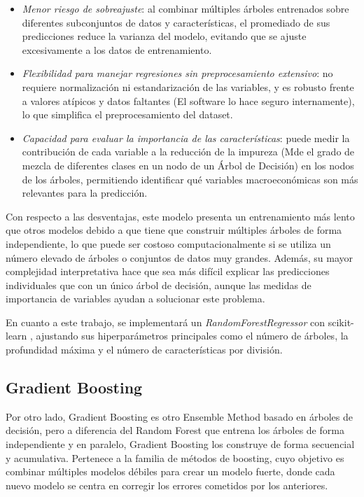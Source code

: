 \begin{itemize}
    \item \emph{Menor riesgo de sobreajuste}: al combinar múltiples árboles entrenados sobre diferentes subconjuntos de datos y características, el promediado de sus predicciones reduce la varianza del modelo, evitando que se ajuste excesivamente a los datos de entrenamiento.
    \item \emph{Flexibilidad para manejar regresiones sin preprocesamiento extensivo}: no requiere normalización ni estandarización de las variables, y es robusto frente a valores atípicos y datos faltantes (El software lo hace seguro internamente), lo que simplifica el preprocesamiento del dataset.
    \item \emph{Capacidad para evaluar la importancia de las características}: puede medir la contribución de cada variable a la reducción de la impureza (Mde el grado de mezcla de diferentes clases en un nodo de un Árbol de Decisión) en los nodos de los árboles, permitiendo identificar qué variables macroeconómicas son más relevantes para la predicción.
\end{itemize}

Con respecto a las desventajas, este modelo presenta un entrenamiento más lento que otros modelos debido a que tiene que construir múltiples árboles de forma independiente, lo que puede ser costoso computacionalmente si se utiliza un número elevado de árboles o conjuntos de datos muy grandes. Además, su mayor complejidad interpretativa hace que sea más difícil explicar las predicciones individuales que con un único árbol de decisión, aunque las medidas de importancia de variables ayudan a solucionar este problema.

En cuanto a este trabajo, se implementará un \textit{RandomForestRegressor} con scikit-learn \cite{scikit_learn}, ajustando sus hiperparámetros principales como el número de árboles, la profundidad máxima y el número de características por división.
\subsection{Gradient Boosting}

Por otro lado, Gradient Boosting \cite{scikit_gb} es otro Ensemble Method basado en árboles de decisión, pero a diferencia del Random Forest que entrena los árboles de forma independiente y en paralelo, Gradient Boosting los construye de forma secuencial y acumulativa. Pertenece a la familia de métodos de boosting, cuyo objetivo es combinar múltiples modelos débiles para crear un modelo fuerte, donde cada nuevo modelo se centra en corregir los errores cometidos por los anteriores.

